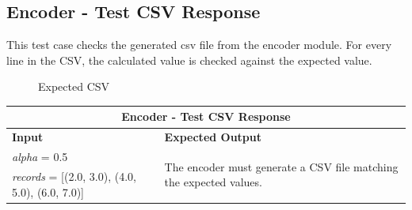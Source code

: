\vspace*{1em}
\subsection{Encoder - Test CSV Response}
\begin{flushleft}
    This test case checks the generated csv file from the encoder module. 
    For every line in the CSV, the calculated value is checked against the expected value.
\vspace*{1em}

\begin{figure}[h!]
    \centering
    \caption{Expected CSV}
    \label{fig:CSV output}
  \end{figure}
\vspace*{1em}

\begin{tabular}{ |p{6cm}||p{6cm} |  }
    \hline
    \multicolumn{2}{|c|}{\textbf{Encoder - Test CSV Response}} \\
    \hline
    \textbf{Input} & \textbf{Expected Output}\\
    \hline
    \textit{alpha} = 0.5 & \multirow{3}{15em}{The encoder must generate a CSV file matching the expected values.} \\
    \textit{records} = [(2.0, 3.0), (4.0, 5.0), (6.0, 7.0)] & \\
    
    \hline
\end{tabular}
\end{flushleft}

\vspace*{1em}
